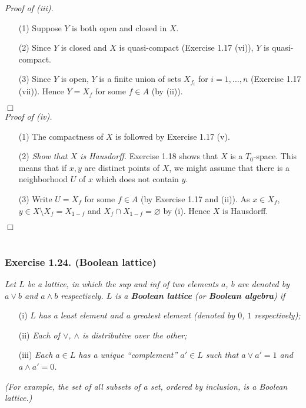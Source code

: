 \documentclass{article}
\begin{document}
\emph{Proof of (iii).}
\begin{enumerate}
\item[(1)]
  Suppose $Y$ is both open and closed in $X$.

\item[(2)]
  Since $Y$ is closed and $X$ is quasi-compact (Exercise 1.17 (vi)), $Y$ is quasi-compact.

\item[(3)]
  Since $Y$ is open, $Y$ is a finite union of sets $X_{f_i}$ for $i = 1, \ldots, n$ (Exercise 1.17 (vii)).
  Hence $Y = X_f$ for some $f \in A$ (by (ii)).
\end{enumerate}
$\Box$ \\



\emph{Proof of (iv).}
\begin{enumerate}
\item[(1)]
  The compactness of $X$ is followed by Exercise 1.17 (v).

\item[(2)]
  \emph{Show that $X$ is Hausdorff.}
  Exercise 1.18 shows that $X$ is a $T_0$-space.
  This means that if $x, y$ are distinct points of $X$,
  we might assume that there is a neighborhood $U$ of $x$ which does not contain $y$.

\item[(3)]
  Write $U = X_f$ for some $f \in A$ (by Exercise 1.17 and (ii)).
  As $x \in X_f$, $y \in X \setminus X_f = X_{1-f}$ and $X_f \cap X_{1-f} = \varnothing$ by (i).
  Hence $X$ is Hausdorff.
\end{enumerate}
$\Box$ \\\\






\subsubsection*{Exercise 1.24. (Boolean lattice)}
\emph{Let $L$ be a lattice, in which the sup and inf of two elements $a$, $b$ are denoted by
$a \vee b$ and $a \wedge b$ respectively.
$L$ is a \textbf{Boolean lattice} (or \textbf{Boolean algebra}) if}
\begin{enumerate}
\item[(i)]
  \emph{$L$ has a least element and a greatest element (denoted by $0$, $1$ respectively);}

\item[(ii)]
  \emph{Each of $\vee$, $\wedge$ is distributive over the other;}

\item[(iii)]
  \emph{Each $a \in L$ has a unique ``complement'' $a' \in L$ such that
  $a \vee a' = 1$ and $a \wedge a' = 0$.}
\end{enumerate}
\emph{(For example, the set of all subsets of a set, ordered by inclusion, is a Boolean lattice.)} \\
\end{document}
